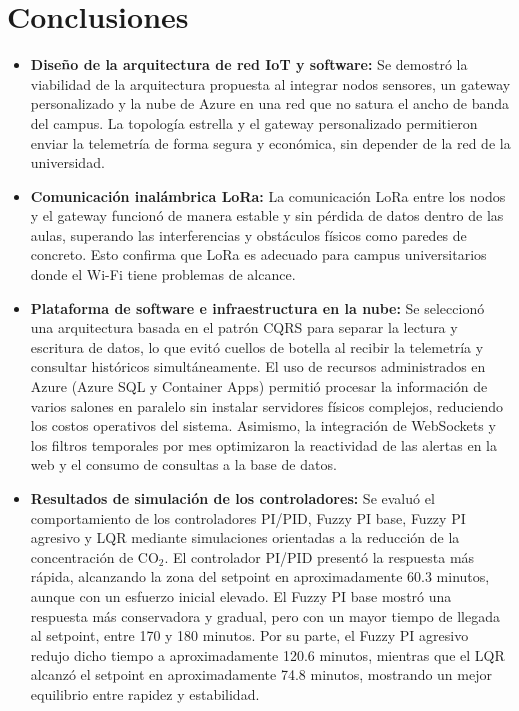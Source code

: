 
\section{Conclusiones}

\begin{itemize}
    \item \textbf{Diseño de la arquitectura de red IoT y software:} Se demostró la viabilidad de la arquitectura propuesta al integrar nodos sensores, un gateway personalizado y la nube de Azure en una red que no satura el ancho de banda del campus. La topología estrella y el gateway personalizado permitieron enviar la telemetría de forma segura y económica, sin depender de la red de la universidad.

    \item \textbf{Comunicación inalámbrica LoRa:} La comunicación LoRa entre los nodos y el gateway funcionó de manera estable y sin pérdida de datos dentro de las aulas, superando las interferencias y obstáculos físicos como paredes de concreto. Esto confirma que LoRa es adecuado para campus universitarios donde el Wi-Fi tiene problemas de alcance.

    \item \textbf{Plataforma de software e infraestructura en la nube:} Se seleccionó una arquitectura basada en el patrón CQRS para separar la lectura y escritura de datos, lo que evitó cuellos de botella al recibir la telemetría y consultar históricos simultáneamente. El uso de recursos administrados en Azure (Azure SQL y Container Apps) permitió procesar la información de varios salones en paralelo sin instalar servidores físicos complejos, reduciendo los costos operativos del sistema. Asimismo, la integración de WebSockets y los filtros temporales por mes optimizaron la reactividad de las alertas en la web y el consumo de consultas a la base de datos.

    \item \textbf{Resultados de simulación de los controladores:} Se evaluó el comportamiento de los controladores PI/PID, Fuzzy PI base, Fuzzy PI agresivo y LQR mediante simulaciones orientadas a la reducción de la concentración de CO\(_2\). El controlador PI/PID presentó la respuesta más rápida, alcanzando la zona del setpoint en aproximadamente 60.3 minutos, aunque con un esfuerzo inicial elevado. El Fuzzy PI base mostró una respuesta más conservadora y gradual, pero con un mayor tiempo de llegada al setpoint, entre 170 y 180 minutos. Por su parte, el Fuzzy PI agresivo redujo dicho tiempo a aproximadamente 120.6 minutos, mientras que el LQR alcanzó el setpoint en aproximadamente 74.8 minutos, mostrando un mejor equilibrio entre rapidez y estabilidad.


\end{itemize}
